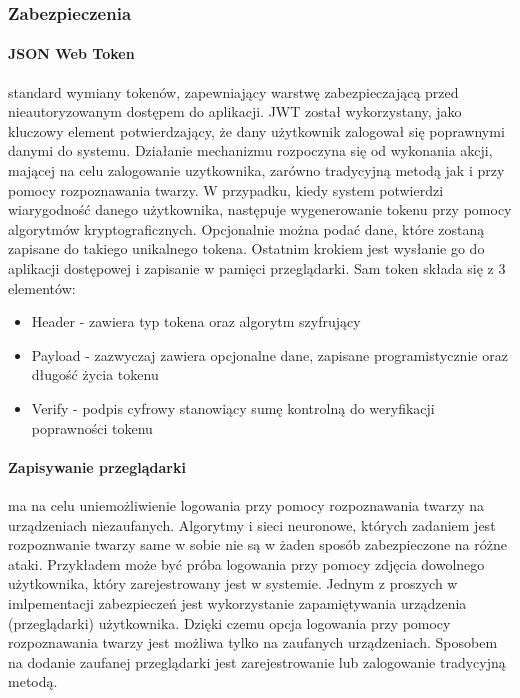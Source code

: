 
\subsubsection{Zabezpieczenia}
\paragraph{JSON Web Token} standard wymiany tokenów, zapewniający warstwę zabezpieczającą przed nieautoryzowanym dostępem do aplikacji. JWT został wykorzystany, jako kluczowy element potwierdzający, że dany użytkownik zalogował się poprawnymi danymi do systemu. Działanie mechanizmu rozpoczyna się od wykonania akcji, mającej na celu zalogowanie uzytkownika, zarówno tradycyjną metodą jak i przy pomocy rozpoznawania twarzy. W przypadku, kiedy system potwierdzi wiarygodność danego użytkownika, następuje wygenerowanie tokenu przy pomocy algorytmów kryptograficznych. Opcjonalnie można podać dane, które zostaną zapisane do takiego unikalnego tokena. Ostatnim krokiem jest wysłanie go do aplikacji dostępowej i zapisanie w pamięci przeglądarki. Sam token składa się z 3 elementów:
\begin{itemize}
  \item Header - zawiera typ tokena oraz algorytm szyfrujący
  \item Payload - zazwyczaj zawiera opcjonalne dane, zapisane programistycznie oraz długość życia tokenu
  \item Verify - podpis cyfrowy stanowiący sumę kontrolną do weryfikacji poprawności tokenu
\end{itemize}

\paragraph{Zapisywanie przeglądarki} ma na celu uniemożliwienie logowania przy pomocy rozpoznawania twarzy na urządzeniach niezaufanych. Algorytmy i sieci neuronowe, których zadaniem jest rozpoznwanie twarzy same w sobie nie są w żaden sposób zabezpieczone na różne ataki. Przykładem może być próba logowania przy pomocy zdjęcia dowolnego użytkownika, który zarejestrowany jest w systemie. Jednym z proszych w imlpementacji zabezpieczeń jest wykorzystanie zapamiętywania urządzenia (przeglądarki) użytkownika. Dzięki czemu opcja logowania przy pomocy rozpoznawania twarzy jest możliwa tylko na zaufanych urządzeniach. Sposobem na dodanie zaufanej przeglądarki jest zarejestrowanie lub zalogowanie tradycyjną metodą.


